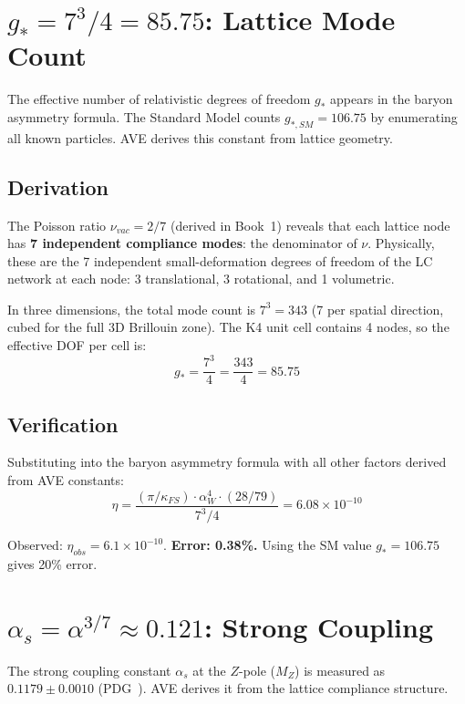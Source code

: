 \section{$g_* = 7^3/4 = 85.75$: Lattice Mode Count}
\label{sec:g_star_derivation}

The effective number of relativistic degrees of freedom $g_*$
appears in the baryon asymmetry formula.  The Standard Model
counts $g_{*,SM} = 106.75$ by enumerating all known particles.
AVE derives this constant from lattice geometry.

\subsection{Derivation}

The Poisson ratio $\nu_{vac} = 2/7$ (derived in Book~1) reveals
that each lattice node has \textbf{7 independent compliance modes}:
the denominator of $\nu$.  Physically, these are the 7 independent
small-deformation degrees of freedom of the LC network at each
node: 3 translational, 3 rotational, and 1 volumetric.

In three dimensions, the total mode count is $7^3 = 343$ (7 per
spatial direction, cubed for the full 3D Brillouin zone).  The
K4 unit cell contains 4 nodes, so the effective DOF per cell is:
\begin{equation}
    \boxed{g_* = \frac{7^3}{4} = \frac{343}{4} = 85.75}
\end{equation}

\subsection{Verification}

Substituting into the baryon asymmetry formula with all other
factors derived from AVE constants:
\begin{equation}
    \eta = \frac{(\pi/\kappa_{FS}) \cdot \alpha_W^4 \cdot (28/79)}{7^3/4}
    = 6.08 \times 10^{-10}
\end{equation}

Observed: $\eta_{obs} = 6.1 \times 10^{-10}$.
\textbf{Error: 0.38\%.}  Using the SM value $g_* = 106.75$
gives 20\% error.

\section{$\alpha_s = \alpha^{3/7} \approx 0.121$: Strong Coupling}
\label{sec:alpha_s_derivation}

The strong coupling constant $\alpha_s$ at the $Z$-pole ($M_Z$)
is measured as $0.1179 \pm 0.0010$ (PDG~\cite{pdg2022}).  AVE derives it from
the lattice compliance structure.

